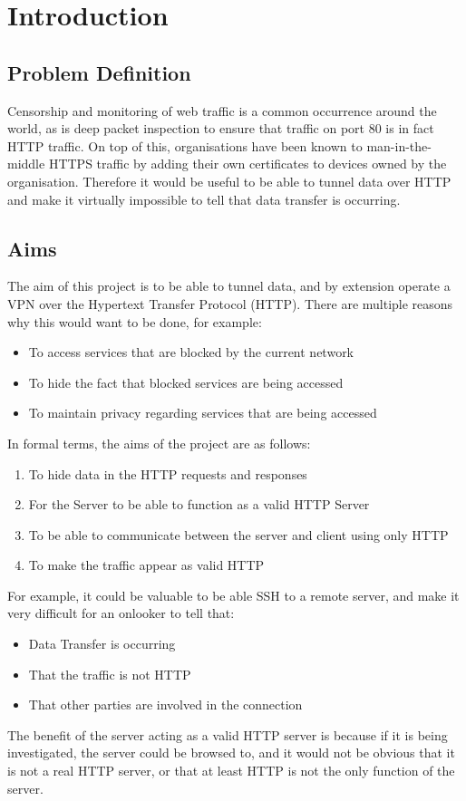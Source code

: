 \section{Introduction}
\subsection{Problem Definition}
Censorship and monitoring of web traffic is a common occurrence around the world, as is deep packet inspection to ensure that traffic on port 80 is in fact HTTP traffic.
On top of this, organisations have been known to man-in-the-middle HTTPS traffic by adding their own certificates to devices owned by the organisation.
Therefore it would be useful to be able to tunnel data over HTTP and make it virtually impossible to tell that data transfer is occurring.

\subsection{Aims}
The aim of this project is to be able to tunnel data, and by extension operate a VPN over the Hypertext Transfer Protocol (HTTP). There are multiple reasons why this would want to be done, for example:
\begin{itemize}
    \item To access services that are blocked by the current network
    \item To hide the fact that blocked services are being accessed
    \item To maintain privacy regarding services that are being accessed
\end{itemize}
\vspace{0.5cm}
In formal terms, the aims of the project are as follows:
\begin{enumerate}
    \item To hide data in the HTTP requests and responses
    \item For the Server to be able to function as a valid HTTP Server
    \item To be able to communicate between the server and client using only HTTP
    \item To make the traffic appear as valid HTTP
\end{enumerate}
For example, it could be valuable to be able SSH to a remote server, and make it very difficult for an onlooker to tell that:
\begin{itemize}
    \item Data Transfer is occurring
    \item That the traffic is not HTTP
    \item That other parties are involved in the connection
\end{itemize}
The benefit of the server acting as a valid HTTP server is because if it is being investigated, the server could be browsed to, and it would not be obvious that it is not a real HTTP server, or that at least HTTP is not the only function of the server.

